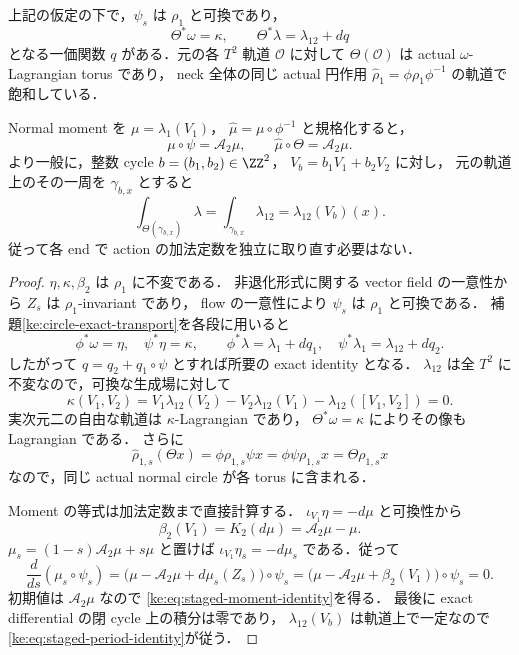 \begin{theorem}
\label{ke:staged-neck-averaging}
上記の仮定の下で，$\psi_s$ は $\rho_1$ と可換であり，
\[
 \Theta^*\omega=\kappa,\qquad
 \Theta^*\lambda=\lambda_{12}+dq
\]
となる一価関数 $q$ がある．元の各 $T^2$ 軌道 $\mathcal O$ に対して
$\Theta(\mathcal O)$ は actual $\omega$-Lagrangian torus であり，
neck 全体の同じ actual 円作用
$\widehat\rho_1=\phi\rho_1\phi^{-1}$ の軌道で飽和している．

Normal moment を
$\mu=\lambda_1(V_1)$，
$\widehat\mu=\mu\circ\phi^{-1}$ と規格化すると，
\begin{equation}\label{ke:eq:staged-moment-identity}
 \mu\circ\psi=\mathcal A_2\mu,\qquad
 \widehat\mu\circ\Theta=\mathcal A_2\mu.
\end{equation}
より一般に，整数 cycle $b=(b_1,b_2)\in\ZZ^2$，
$V_b=b_1V_1+b_2V_2$ に対し，
元の軌道上のその一周を $\gamma_{b,x}$ とすると
\begin{equation}\label{ke:eq:staged-period-identity}
 \int_{\Theta(\gamma_{b,x})}\lambda
 =\int_{\gamma_{b,x}}\lambda_{12}
 =\lambda_{12}(V_b)(x).
\end{equation}
従って各 end で action の加法定数を独立に取り直す必要はない．
\end{theorem}
\begin{proof}
$\eta,\kappa,\beta_2$ は $\rho_1$ に不変である．
非退化形式に関する vector field の一意性から $Z_s$ は $\rho_1$-invariant であり，
flow の一意性により $\psi_s$ は $\rho_1$ と可換である．
補題\ref{ke:circle-exact-transport}を各段に用いると
\[
 \phi^*\omega=\eta,\quad \psi^*\eta=\kappa,\qquad
 \phi^*\lambda=\lambda_1+dq_1,\quad
 \psi^*\lambda_1=\lambda_{12}+dq_2.
\]
したがって $q=q_2+q_1\circ\psi$ とすれば所要の exact identity となる．
$\lambda_{12}$ は全 $T^2$ に不変なので，可換な生成場に対して
\[
 \kappa(V_1,V_2)
 =V_1\lambda_{12}(V_2)-V_2\lambda_{12}(V_1)
     -\lambda_{12}([V_1,V_2])=0.
\]
実次元二の自由な軌道は $\kappa$-Lagrangian であり，
$\Theta^*\omega=\kappa$ によりその像も Lagrangian である．
さらに
\[
 \widehat\rho_{1,s}(\Theta x)
 =\phi\rho_{1,s}\psi x
 =\phi\psi\rho_{1,s}x
 =\Theta\rho_{1,s}x
\]
なので，同じ actual normal circle が各 torus に含まれる．

Moment の等式は加法定数まで直接計算する．
$\iota_{V_1}\eta=-d\mu$ と可換性から
\[
 \beta_2(V_1)=K_2(d\mu)=\mathcal A_2\mu-\mu.
\]
$\mu_s=(1-s)\mathcal A_2\mu+s\mu$ と置けば
$\iota_{V_1}\eta_s=-d\mu_s$ である．従って
\[
 \frac d{ds}(\mu_s\circ\psi_s)
 =\bigl(\mu-\mathcal A_2\mu+d\mu_s(Z_s)\bigr)\circ\psi_s
 =\bigl(\mu-\mathcal A_2\mu+\beta_2(V_1)\bigr)\circ\psi_s=0.
\]
初期値は $\mathcal A_2\mu$ なので
\eqref{ke:eq:staged-moment-identity}を得る．
最後に exact differential の閉 cycle 上の積分は零であり，
$\lambda_{12}(V_b)$ は軌道上で一定なので
\eqref{ke:eq:staged-period-identity}が従う．
\end{proof}

